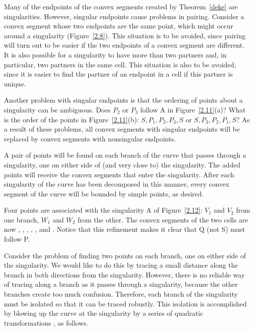 Many of the endpoints of the convex segments created by Theorem~\ref{deke} 
are singularities.  However, singular endpoints cause problems in pairing.
Consider a convex segment whose two endpoints are the same point,
which might occur around a singularity (Figure~\ref{2.8}).
This situation is to be avoided, since pairing will turn out to be easier if 
the two endpoints of a convex segment are different.
It is also possible for a singularity to have more than two
partners and, in particular, two partners in the same cell.
This situation is also to be avoided, since it is easier to find the partner 
of an endpoint in a cell if this partner is unique.

Another problem with singular endpoints is that the ordering of points about
a singularity can be ambiguous.
Does $P_{2}$ or $P_{3}$ follow A in Figure~\ref{2.11}(a)?
What is the order of the points in Figure~\ref{2.11}(b): 
$S, P_{1}, P_{2}, P_{3}, S$ or $S, P_{3}, P_{2}, P_{1}, S$?
As a result of these problems, all convex segments with singular endpoints 
will be replaced by convex segments with nonsingular endpoints.


A pair of points will be found on each branch of the curve
that passes through a singularity, one on either side of (and very close to) 
the singularity.
The added points will receive the convex segments that enter the singularity.
After each singularity of the curve has been decomposed in this manner, every 
convex segment of the curve will be bounded by simple points, as desired.

\begin{example}
\label{eg-pseudo}
Four points are associated with the singularity A of Figure~\ref{2.12}:
$V_{1}$ and $V_{2}$ from one branch, $W_{1}$ and $W_{2}$ from the other.
The convex segments of the two cells are now , , 
, , , and .
Notice that this refinement makes it clear that Q (not S) must follow P.
\end{example}


Consider the problem of finding two points on each branch, one on either 
side of the singularity.
We would like to do this by tracing a small distance along the branch
in both directions from the singularity.
However, there is no reliable way of tracing along a branch as it passes
through a singularity, because the other branches create too much confusion.
Therefore, each branch of the singularity must be isolated so that it can 
be traced robustly.
This isolation is accomplished by blowing up the curve at the singularity by 
a series of quadratic transformations \cite{bhhl,walker}, as follows.

